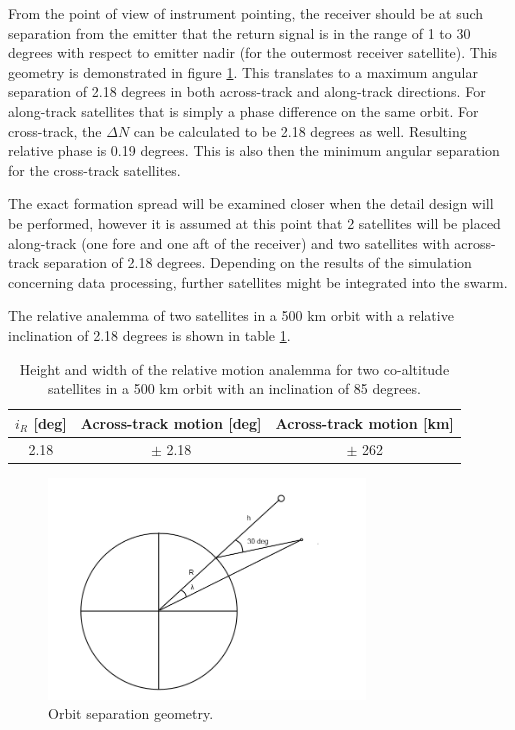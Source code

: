 From the point of view of instrument pointing, the receiver should be at such separation from the emitter that the return signal is in the range of 1 to 30 degrees with respect to emitter nadir (for the outermost receiver satellite). This geometry is demonstrated in figure \ref{fig:separation}. This translates to a maximum angular separation of 2.18 degrees in both across-track and along-track directions. For along-track satellites that is simply a phase difference on the same orbit. For cross-track, the $\Delta N$ can be calculated to be 2.18 degrees as well. Resulting relative phase is 0.19 degrees. This is also then the minimum angular separation for the cross-track satellites.

The exact formation spread will be examined closer when the detail design will be performed, however it is assumed at this point that 2 satellites will be placed along-track (one fore and one aft of the receiver) and two satellites with across-track separation of 2.18 degrees. Depending on the results of the simulation concerning data processing, further satellites might be integrated into the swarm.

The relative analemma of two satellites in a 500 km orbit with a relative inclination of 2.18 degrees is shown in table \ref{table:analemma}.

\begin{table}[ht]
	\centering
		\begin{tabular}{c |c | c }
		 \textbf{$i_R$} [deg] & \textbf{Across-track motion [deg]} & \textbf{Across-track motion [km]} \\ \hline \hline
		 2.18 & $\pm$ 2.18 & $\pm$ 262 
		\end{tabular}
	\caption{Height and width of the relative motion analemma for two co-altitude satellites in a 500 km orbit with an inclination of 85 degrees.}
	\label{table:analemma}
\end{table}

\begin{figure}[!ht]
\centering
\includegraphics[width=0.75\textwidth, angle=0]{chapters/img/seperation.png}
\caption{Orbit separation geometry.}
\label{fig:separation}
\end{figure}

